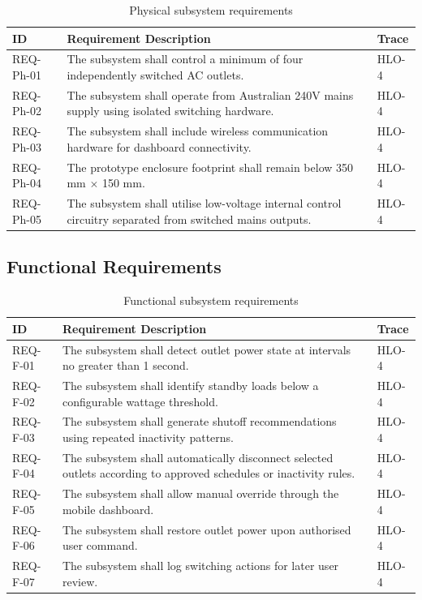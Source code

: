 \documentclass[11pt, twoside, a4paper]{article}
\begin{document}
\begin{table}[H]
\caption{Physical subsystem requirements}
\centering
\renewcommand{\arraystretch}{1.2}
\begin{tabular}{|p{2.5cm}|p{10cm}|p{2cm}|}
\hline
\textbf{ID} & \textbf{Requirement Description} & \textbf{Trace} \\ \hline
REQ-Ph-01 & The subsystem shall control a minimum of four independently switched AC outlets. & HLO-4 \\ \hline
REQ-Ph-02 & The subsystem shall operate from Australian 240V mains supply using isolated switching hardware. & HLO-4 \\ \hline
REQ-Ph-03 & The subsystem shall include wireless communication hardware for dashboard connectivity. & HLO-4 \\ \hline
REQ-Ph-04 & The prototype enclosure footprint shall remain below 350 mm \(\times\) 150 mm. & HLO-4 \\ \hline
REQ-Ph-05 & The subsystem shall utilise low-voltage internal control circuitry separated from switched mains outputs. & HLO-4 \\ \hline
\end{tabular}
\end{table}

\subsection{Functional Requirements}

\begin{table}[H]
\caption{Functional subsystem requirements}
\centering
\renewcommand{\arraystretch}{1.2}
\begin{tabular}{|p{2.5cm}|p{10cm}|p{2cm}|}
\hline
\textbf{ID} & \textbf{Requirement Description} & \textbf{Trace} \\ \hline
REQ-F-01 & The subsystem shall detect outlet power state at intervals no greater than 1 second. & HLO-4 \\ \hline
REQ-F-02 & The subsystem shall identify standby loads below a configurable wattage threshold. & HLO-4 \\ \hline
REQ-F-03 & The subsystem shall generate shutoff recommendations using repeated inactivity patterns. & HLO-4 \\ \hline
REQ-F-04 & The subsystem shall automatically disconnect selected outlets according to approved schedules or inactivity rules. & HLO-4 \\ \hline
REQ-F-05 & The subsystem shall allow manual override through the mobile dashboard. & HLO-4 \\ \hline
REQ-F-06 & The subsystem shall restore outlet power upon authorised user command. & HLO-4 \\ \hline
REQ-F-07 & The subsystem shall log switching actions for later user review. & HLO-4 \\ \hline
\end{tabular}
\end{table}
\end{document}
